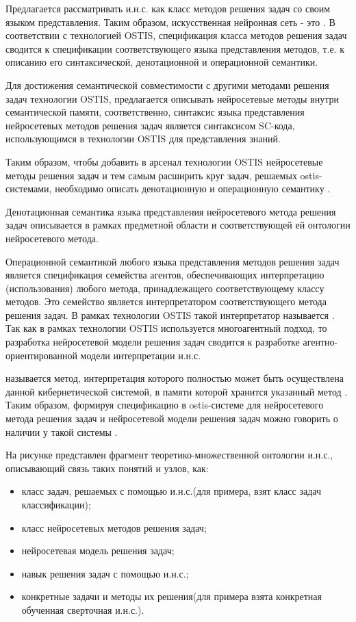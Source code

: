 Предлагается рассматривать и.н.с. как класс методов решения задач со своим языком представления. Таким образом, искусственная нейронная сеть - это . В соответствии с технологией OSTIS, спецификация класса методов решения задач сводится к спецификации соответствующего языка представления методов, т.е. к описанию его синтаксической, денотационной и операционной семантики.

Для достижения семантической совместимости с другими методами решения задач технологии OSTIS, предлагается описывать нейросетевые методы внутри семантической памяти, соответственно, синтаксис языка представления нейросетевых методов решения задач является синтаксисом SC-кода, использующимся в технологии OSTIS для представления знаний.

Таким образом, чтобы добавить в арсенал технологии OSTIS нейросетевые методы решения задач и тем самым расширить круг задач, решаемых ostis-системами, необходимо описать денотационную и операционную семантику .

Денотационная семантика языка представления нейросетевого метода решения задач описывается в рамках предметной области и соответствующей ей онтологии нейросетевого метода.

Операционной семантикой любого языка представления методов решения задач является спецификация семейства агентов, обеспечивающих интерпретацию (использования) любого метода, принадлежащего соответствующему классу методов. Это семейство является интерпретатором соответствующего метода решения задач. В рамках технологии OSTIS такой интерпретатор называется . Так как в рамках технологии OSTIS используется многоагентный подход, то разработка нейросетевой модели решения задач сводится к разработке агентно-ориентированной модели интерпретации и.н.с.

 называется метод, интерпретация которого полностью может быть осуществлена данной кибернетической системой, в памяти которой хранится указанный метод . Таким образом, формируя спецификацию в ostis-системе для нейросетевого метода решения задач и нейросетевой модели решения задач можно говорить о наличии у такой системы .

На рисунке  представлен фрагмент теоретико-множественной онтологии и.н.с., описывающий связь таких понятий и узлов, как:
\begin{itemize}
	\item класс задач, решаемых с помощью и.н.с.(для примера, взят класс задач классификации);
	\item класс нейросетевых методов решения задач;
	\item нейросетевая модель решения задач;
	\item навык решения задач с помощью и.н.с.;
	\item конкретные задачи и методы их решения(для примера взята конкретная обученная сверточная и.н.с.).
\end{itemize}

